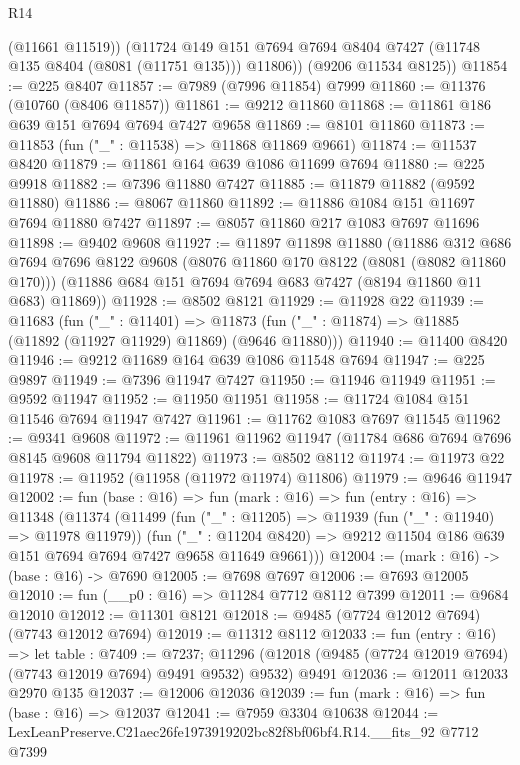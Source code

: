 \begin{lexlean}{R14}
\begin{coremodule}
          (@11661 @11519))
        (@11724 @149 @151 @7694 @7694 @8404 @7427 (@11748 @135 @8404 (@8081 (@11751 @135))) @11806))
      (@9206 @11534 @8125))
@11854 := @225 @8407
@11857 := @7989 (@7996 @11854) @7999
@11860 := @11376 (@10760 (@8406 @11857))
@11861 := @9212 @11860
@11868 := @11861 @186 @639 @151 @7694 @7694 @7427 @9658
@11869 := @8101 @11860
@11873 := @11853 (fun ("_" : @11538) => @11868 @11869 @9661)
@11874 := @11537 @8420
@11879 := @11861 @164 @639 @1086 @11699 @7694
@11880 := @225 @9918
@11882 := @7396 @11880 @7427
@11885 := @11879 @11882 (@9592 @11880)
@11886 := @8067 @11860
@11892 := @11886 @1084 @151 @11697 @7694 @11880 @7427
@11897 := @8057 @11860 @217 @1083 @7697 @11696
@11898 := @9402 @9608
@11927 := @11897
    @11898
    @11880
    (@11886
      @312
      @686
      @7694
      @7696
      @8122
      @9608
      (@8076 @11860 @170 @8122 (@8081 (@8082 @11860 @170)))
      (@11886 @684 @151 @7694 @7694 @683 @7427 (@8194 @11860 @11 @683) @11869))
@11928 := @8502 @8121
@11929 := @11928 @22
@11939 := @11683
    (fun ("_" : @11401) =>
    @11873 (fun ("_" : @11874) => @11885 (@11892 (@11927 @11929) @11869) (@9646 @11880)))
@11940 := @11400 @8420
@11946 := @9212 @11689 @164 @639 @1086 @11548 @7694
@11947 := @225 @9897
@11949 := @7396 @11947 @7427
@11950 := @11946 @11949
@11951 := @9592 @11947
@11952 := @11950 @11951
@11958 := @11724 @1084 @151 @11546 @7694 @11947 @7427
@11961 := @11762 @1083 @7697 @11545
@11962 := @9341 @9608
@11972 := @11961 @11962 @11947 (@11784 @686 @7694 @7696 @8145 @9608 @11794 @11822)
@11973 := @8502 @8112
@11974 := @11973 @22
@11978 := @11952 (@11958 (@11972 @11974) @11806)
@11979 := @9646 @11947
@12002 := fun (base : @16) =>
  fun (mark : @16) =>
  fun (entry : @16) =>
  @11348
    (@11374
      (@11499
        (fun ("_" : @11205) => @11939 (fun ("_" : @11940) => @11978 @11979))
        (fun ("_" : @11204 @8420) =>
        @9212 @11504 @186 @639 @151 @7694 @7694 @7427 @9658 @11649 @9661)))
@12004 := (mark : @16) -> (base : @16) -> @7690
@12005 := @7698 @7697
@12006 := @7693 @12005
@12010 := fun (__p0 : @16) => @11284 @7712 @8112 @7399
@12011 := @9684 @12010
@12012 := @11301 @8121
@12018 := @9485 (@7724 @12012 @7694) (@7743 @12012 @7694)
@12019 := @11312 @8112
@12033 := fun (entry : @16) =>
  let table : @7409 := @7237;
  @11296 (@12018 (@9485 (@7724 @12019 @7694) (@7743 @12019 @7694) @9491 @9532) @9532) @9491
@12036 := @12011 @12033 @2970 @135
@12037 := @12006 @12036
@12039 := fun (mark : @16) => fun (base : @16) => @12037
@12041 := @7959 @3304 @10638
@12044 := LexLeanPreserve.C21aec26fe1973919202bc82f8bf06bf4.R14.__fits_92 @7712 @7399

\end{coremodule}
\end{lexlean}
